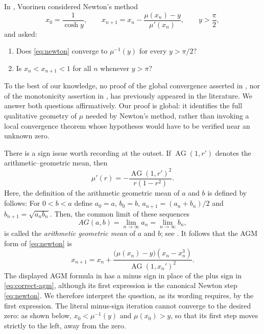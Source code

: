 \documentclass[11pt]{article}
\theoremstyle{remark}
\newcommand{\M}{\operatorname{AG}}
\begin{document}
In \cite[Problems 3.38(a)--(b)]{VuorinenSurvey}, Vuorinen considered Newton's
method
\begin{equation}\label{eq:newton}
 x_0=\frac1{\cosh y},
 \qquad
 x_{n+1}=x_n-\frac{\mu(x_n)-y}{\mu'(x_n)},
 \qquad y>\frac\pi2,
\end{equation}
and asked:
\begin{enumerate}
 \item[(a)] Does \eqref{eq:newton} converge to $\mu^{-1}(y)$ for every
 $y>\pi/2$?
 \item[(b)] Is $x_n<x_{n+1}<1$ for all $n$ whenever $y>\pi$?
\end{enumerate}
To the best of our knowledge, no proof of the global convergence
asserted in \cite[Problem 3.38(a)]{VuorinenSurvey}, nor of the monotonicity assertion in
\cite[Problem 3.38(b)]{VuorinenSurvey}, has previously appeared in the literature. We answer both questions affirmatively.  Our proof is global: it identifies
the full qualitative geometry of $\mu$ needed by Newton's method, rather than
invoking a local convergence theorem whose hypotheses would have to be
verified near an unknown zero.

There is a sign issue worth recording at the outset.  If
$\M(1,r')$ denotes the arithmetic--geometric mean, then
\begin{equation}\label{eq:mu-prime-intro}
 \mu'(r)=-\frac{\M(1,r')^2}{r(1-r^2)}.
\end{equation}
Here, the definition of the arithmetic geometric mean of $a$ and $b$ is defined by follows: For $0<b<a$ define $a_0=a$, $b_0=b$, $a_{n+1}=(a_n+b_n)/2$ and $b_{n+1}=\sqrt{a_n b_n}$. Then, the common limit of these sequences
\begin{equation*}
  AG(a,b)=\lim_{n\rightarrow\infty}a_n=\lim_{n\rightarrow\infty}b_n,
\end{equation*}
is called the {\it arithmetic geometric mean} of $a$ and $b$; see \cite{BorweinBorwein}.  It follows that the AGM form of \eqref{eq:newton} is
\begin{equation}\label{eq:correct-agm}
 x_{n+1}=x_n+
 \frac{\bigl(\mu(x_n)-y\bigr)(x_n-x_n^3)}{\M(1,x_n')^2}.
\end{equation}
The displayed AGM formula in \cite[Section 3.37]{VuorinenSurvey} has a minus
sign in place of the plus sign in \eqref{eq:correct-agm}, although its first
expression is the canonical Newton step \eqref{eq:newton}.  We therefore
interpret the question, as its wording requires, by the first expression.
The literal minus-sign iteration cannot converge to the desired zero: as
shown below, $x_0<\mu^{-1}(y)$ and $\mu(x_0)>y$, so that its first step moves
strictly to the left, away from the zero.
\end{document}
